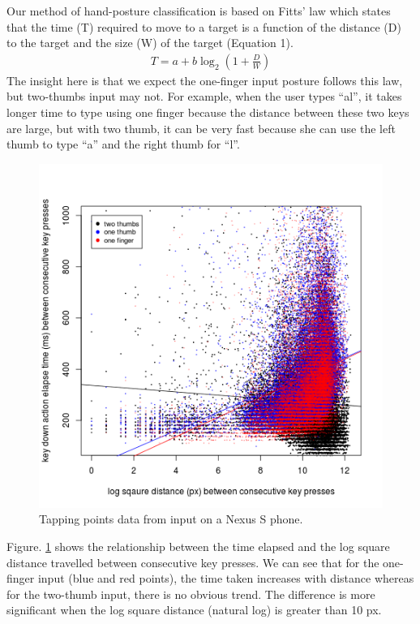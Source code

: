 \documentclass{sigchi}
\begin{document}
Our method of hand-posture classification is based on Fitts’ law which states that the time (T) required to move to a target is a function of the distance (D) to the target and the size (W) of the target (Equation 1).
\begin{align}
T = a + b\log_2(1 + \frac{D}{W})
\end{align}                                                  
The insight here is that we expect the one-finger input posture follows this law,  but two-thumbs input may not. For example, when the user types “al”, it takes longer time to type using one finger because the distance between these two keys are large, but with two thumb, it can be very fast because she can use the left thumb to type “a” and the right thumb for “l”.

\begin{figure}[tb]
  \centering
  \includegraphics[width=0.9\columnwidth]{figures/time-distance.png}
  \caption{Tapping points data from input on a Nexus S phone.}
  \label{fig:time-distance}
\end{figure}

Figure. \ref{fig:time-distance} shows the relationship between the time elapsed 
and the log square distance travelled between consecutive key presses. We can
see that for the one-finger input (blue and red points), the time taken
increases with distance whereas for the two-thumb input, there is no obvious
trend. The difference is more significant when the log square distance (natural
log) is greater than 10 px.
\end{document}
